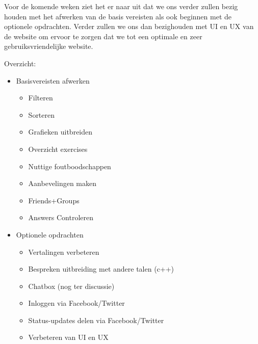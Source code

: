 Voor de komende weken ziet het er naar uit dat we ons verder zullen bezig houden met het afwerken van de basis 
vereisten als ook beginnen met de optionele opdrachten. Verder zullen we ons dan bezighouden met UI en UX van de
website om ervoor te zorgen dat we tot een optimale en zeer gebruiksvriendelijke website.

Overzicht:
\begin{itemize}
	\item Basisvereisten afwerken
	\begin{itemize}
		\item Filteren
		\item Sorteren
		\item Grafieken uitbreiden
		\item Overzicht exercises
		\item Nuttige foutboodschappen
		\item Aanbevelingen maken
		\item Friends+Groups
		\item Answers Controleren
	\end{itemize}
	\item Optionele opdrachten
	\begin{itemize}
		\item Vertalingen verbeteren
		\item Bespreken uitbreiding met andere talen (c++)
		\item Chatbox (nog ter discussie)
		\item Inloggen via Facebook/Twitter
		\item Status-updates delen via Facebook/Twitter
		\item Verbeteren van UI en UX
	\end{itemize}
\end{itemize}

